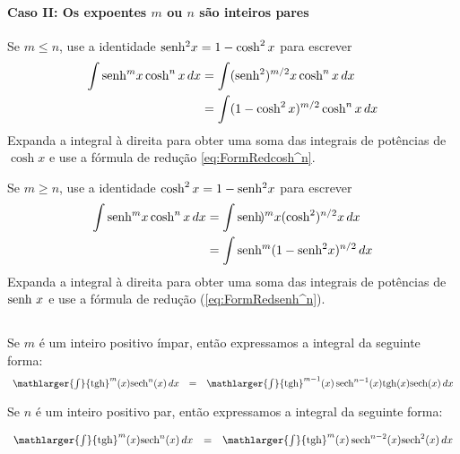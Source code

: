 \cleardoublepage\documentclass[../main.tex]{subfiles}
\begin{document}
\paragraph*{Caso II: Os expoentes \(m\) ou \(n\) são inteiros pares}
\begin{compactenum}[i.]
\item Se $m\leq n$, use a identidade $\operatorname{senh}\,\!\!^2 x = 1 - \cosh^2 x$ para escrever
\begin{align}
    \int \operatorname{senh}\,\!\!^m x \cosh^n x\, dx&=\int (\operatorname{senh}\,\!\!^2)^{m/2} x \cosh^n x\, dx\nonumber\\
    &=\int (1 - \cosh^2 x)^{m/2}\cosh^n x\, dx
\end{align}
Expanda a integral à direita para obter uma soma das integrais de potências de $\cosh x$ e use a fórmula de redução \eqref{eq:FormRedcosh^n}.

\item Se $m\geq n$, use a identidade $\cosh^2 x = 1 - \operatorname{senh}\,\!\!^2 x$ para escrever
\begin{align}
    \int \senh\!\!^m x \cosh^n x\, dx&=\int \senh\!\!)^m x (\cosh^2)^{n/2} x\, dx\nonumber\\
    &=\int \senh\!\!^m (1 - \senh\!\!^2 x)^{n/2}\, dx
\end{align}
Expanda a integral à direita para obter uma soma das integrais de potências de $\operatorname{senh}\, x$ e use a fórmula de redução (\ref{eq:FormRedsenh^n}).
\end{compactenum}

\subsection[\formula{Integrais do tipo   $\int {\rm tgh} ^m (x)\, {\rm sech}^n(x)\,dx$}]{}
\begin{compactenum}[i]
\item Se \(m\) é um inteiro positivo ímpar, então expressamos a integral da seguinte forma:
\[ \begin{array}{lcl} \mathlarger{\int} {\rm tgh} ^m (x) {\rm sech}^n(x)\,dx &=& \mathlarger{\int} {\rm tgh} ^{m-1} (x)\, {\rm sech}^{n-1}(x) {\rm tgh} (x) {\rm sech} (x)\,dx\end{array} \]
\item Se \(n\) é um inteiro positivo par, então expressamos a integral da seguinte forma:

\[ \begin{array}{lcl} \mathlarger{\int} {\rm tgh}^m (x) {\rm sech}^n(x)\,dx &=& \mathlarger{\int} {\rm tgh} ^m (x)\, {\rm sech}^{n-2}(x) {\rm sech}^2 (x)\,dx\\ \end{array} \]
\end{compactenum}
\end{document}
